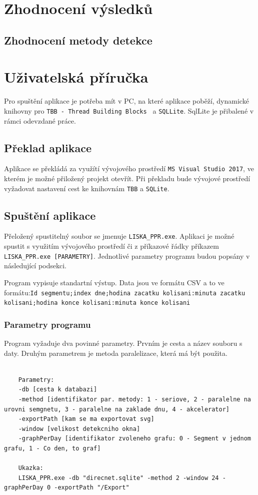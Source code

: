 \documentclass{article}
\begin{document}
	
	\section{Zhodnocení výsledků}
	\subsection{Zhodnocení metody detekce}
	
	\section{Uživatelská příručka}
	Pro spuštění aplikace je potřeba mít v PC, na které aplikace poběží, dynamické knihovny pro \texttt{TBB - Thread Building Blocks } a \texttt{SQLLite}. SqlLite je přibalené v rámci odevzdané práce.
	\subsection{Překlad aplikace}
	Aplikace se překládá za využítí vývojového prostředí \texttt{MS Visual Studio 2017}, ve kterém je možné přiložený projekt otevřít. Při překladu bude vývojové prostředí vyžadovat nastavení cest ke knihovnám \texttt{TBB} a \texttt{SQLite}.
	\subsection{Spuštění aplikace}
	Přeložený spustitelný soubor se jmenuje \texttt{LISKA\_PPR.exe}. Aplikaci je možné spustit s využitím vývojového prostředí či z příkazové řádky příkazem \texttt{LISKA\_PPR.exe [PARAMETRY]}. Jednotlivé parametry programu budou popsány v následující podsekci.
	
	Program vypisuje standartní výstup. Data jsou ve formátu CSV a to ve formátu:\newline \texttt{Id segmentu;index dne;hodina zacatku kolisani:minuta zacatku kolisani;\newline hodina konce kolisani:minuta konce kolisani}
	\subsubsection{Parametry programu}
	
	Program vyžaduje dva povinné parametry. Prvním je cesta a název souboru s daty. Druhým parametrem je metoda paralelizace, která má být použita. 
	
	\vspace{0.4cm}
	\noindent
	\begin{minipage}{\linewidth}
	\begin{lstlisting}
	
	Parametry:
	-db [cesta k databazi]
	-method [identifikator par. metody: 1 - seriove, 2 - paralelne na urovni semgnetu, 3 - paralelne na zaklade dnu, 4 - akcelerator]
	-exportPath [kam se ma exportovat svg]
	-window [velikost detekcniho okna]
	-graphPerDay [identifikator zvoleneho grafu: 0 - Segment v jednom grafu, 1 - Co den, to graf]
	
	Ukazka:
	LISKA_PPR.exe -db "direcnet.sqlite" -method 2 -window 24 -graphPerDay 0 -exportPath "/Export"
	\end{lstlisting} 
	\end{minipage}
	
\end{document}
